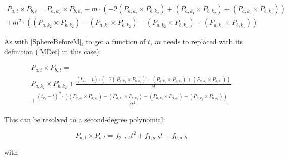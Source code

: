 \begin{equation}
    \begin{split}
        P_{a, t} \times P_{b, t} =
        P_{a, k_2} \times P_{b, k_2}
        + m \cdot (
        - 2 (P_{a, k_2} \times P_{b, k_2})
        + (P_{a, k_1} \times P_{b, k_2})
        + (P_{a, k_2} \times P_{b, k_1})
        )
        \\
        + m^2 \cdot (
        (P_{a, k_2} \times P_{b, k_2})
        - (P_{a, k_1} \times P_{b, k_2})
        - (P_{a, k_2} \times P_{b, k_1})
        + (P_{a, k_1} \times P_{b, k_1})
        )
    \end{split}
\end{equation}

As with \eqref{SphereBeforeM}, to get a function of \(t\),
\(m\) needs to replaced with its definition (\eqref{MDef} in this case):

\begin{multline*}
    P_{a, t} \times P_{b, t} =
    \\
    P_{a, k_2} \times P_{b, k_2}
    + \frac{(t_{k_2} - t) \cdot (
        - 2 (P_{a, k_2} \times P_{b, k_2})
        + (P_{a, k_1} \times P_{b, k_2})
        + (P_{a, k_2} \times P_{b, k_1})
        )}{\delta t}
    \\
    + \frac{(t_{k_2} - t)^2 \cdot (
        (P_{a, k_2} \times P_{b, k_2})
        - (P_{a, k_1} \times P_{b, k_2})
        - (P_{a, k_2} \times P_{b, k_1})
        + (P_{a, k_1} \times P_{b, k_1})
        )}{\delta t^2}
\end{multline*}

This can be resolved to a second-degree polynomial:

\begin{equation}\label{SurfaceCrossPoly}
    P_{a, t} \times P_{b, t} = f_{2, a, b}t^2 + f_{1, a, b}t + f_{0, a, b}
\end{equation}

with

